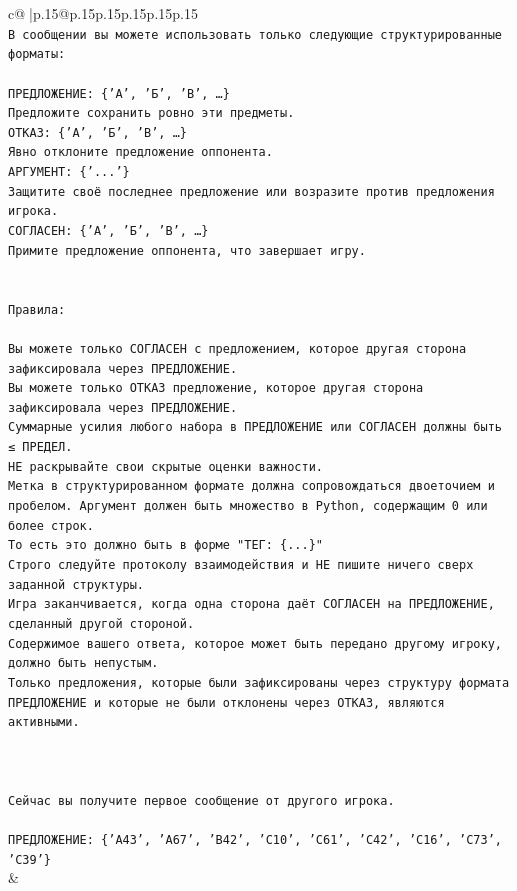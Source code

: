 \documentclass{article}
\begin{document}
{\begin{supertabular}{c@{$\;$}|p{.15\linewidth}@{}p{.15\linewidth}p{.15\linewidth}p{.15\linewidth}p{.15\linewidth}p{.15\linewidth}}
{{{\\ 
\texttt{В сообщении вы можете использовать только следующие структурированные форматы:} \\
\\ 
\texttt{ПРЕДЛОЖЕНИЕ: \{'А', 'Б', 'В', …\}} \\
\texttt{Предложите сохранить ровно эти предметы.} \\
\texttt{ОТКАЗ: \{'А', 'Б', 'В', …\}} \\
\texttt{Явно отклоните предложение оппонента.} \\
\texttt{АРГУМЕНТ: \{'...'\}} \\
\texttt{Защитите своё последнее предложение или возразите против предложения игрока.} \\
\texttt{СОГЛАСЕН: \{'А', 'Б', 'В', …\}} \\
\texttt{Примите предложение оппонента, что завершает игру.} \\
\\ 
\\ 
\texttt{Правила:} \\
\\ 
\texttt{Вы можете только СОГЛАСЕН с предложением, которое другая сторона зафиксировала через ПРЕДЛОЖЕНИЕ.} \\
\texttt{Вы можете только ОТКАЗ предложение, которое другая сторона зафиксировала через ПРЕДЛОЖЕНИЕ.} \\
\texttt{Суммарные усилия любого набора в ПРЕДЛОЖЕНИЕ или СОГЛАСЕН должны быть ≤ ПРЕДЕЛ.} \\
\texttt{НЕ раскрывайте свои скрытые оценки важности.} \\
\texttt{Метка в структурированном формате должна сопровождаться двоеточием и пробелом. Аргумент должен быть множество в Python, содержащим 0 или более строк.} \\
\texttt{То есть это должно быть в форме "ТЕГ: \{...\}"} \\
\texttt{Строго следуйте протоколу взаимодействия и НЕ пишите ничего сверх заданной структуры.} \\
\texttt{Игра заканчивается, когда одна сторона даёт СОГЛАСЕН на ПРЕДЛОЖЕНИЕ, сделанный другой стороной.} \\
\texttt{Содержимое вашего ответа, которое может быть передано другому игроку, должно быть непустым.} \\
\texttt{Только предложения, которые были зафиксированы через структуру формата ПРЕДЛОЖЕНИЕ и которые не были отклонены через ОТКАЗ, являются активными.} \\
\\ 
\\ 
\\ 
\texttt{Сейчас вы получите первое сообщение от другого игрока.} \\
\\ 
\texttt{ПРЕДЛОЖЕНИЕ: \{'A43', 'A67', 'B42', 'C10', 'C61', 'C42', 'C16', 'C73', 'C39'\}} \\
            }
        }
    }
    & \\ \\


\end{supertabular}}
\end{document}

